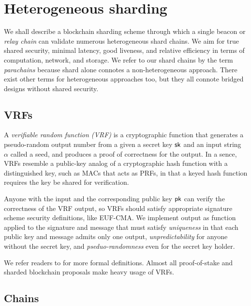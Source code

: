 
\section{Heterogeneous sharding}

We shall describe a blockchain sharding scheme through which a single beacon or {\em relay chain} can validate numerous heterogeneous shard chains.  We aim for true shared security, minimal latency, good liveness, and relative efficiency in terms of computation, network, and storage.  We refer to our shard chains by the term {\em parachains} because shard alone connotes a non-heterogeneous approach.  There exist other terms for heterogeneous approaches too, but they all connote bridged designs without shared security.

\subsection{VRFs}

A {\em verifiable random function (VRF)} is a cryptographic function that generates a pseudo-random output number from a given a secret key $\mathsf{sk}$ and an input string $\alpha$ called a seed, and produces a proof of correctness for the output.  In a sence, VRFs resemble a public-key analog of a cryptographic hash function with a distinguished key, such as MACs that acts as PRFs, in that a keyed hash function requires the key be shared for verification. 

Anyone with the input and the corresponding public key $\mathsf{pk}$ can verify the correctness of the VRF output, so VRFs should satisfy appropriate signature scheme security definitions, like EUF-CMA.  We implement output as function applied to the signature and message that must satisfy {\em uniqueness} in that each public key and message admits only one output, {\em unpredictability} for anyone without the secret key, and {\em pseduo-randomness} even for the secret key holder.

We refer readers to \cite[\S1]{Sassafras} for more formal definitions.
Almost all proof-of-stake and sharded blockchain proposals make heavy usage of VRFs.

\subsection{Chains}

